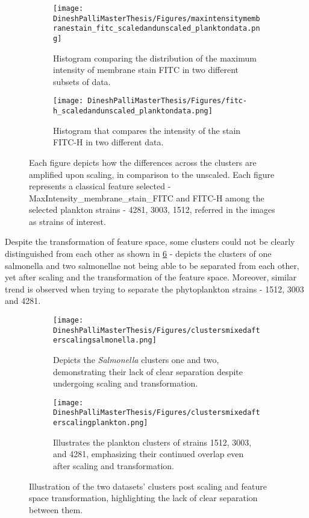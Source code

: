 \documentclass[12pt,a4paper]{article}
\begin{document}
\begin{figure}
  \centering
  \begin{subfigure}{0.45\linewidth}
    \texttt{[image: DineshPalliMasterThesis/Figures/maxintensitymembranestain\_fitc\_scaledandunscaled\_planktondata.png]}
    \caption{Histogram comparing the distribution of the maximum intensity of membrane stain FITC in two different subsets of data.}
    \label{multifig2:image_a}
  \end{subfigure}
  \hfill
  \begin{subfigure}{0.4\linewidth}
    \texttt{[image: DineshPalliMasterThesis/Figures/fitc-h\_scaledandunscaled\_planktondata.png]}
    \caption{Histogram that compares the intensity of the stain FITC-H in two different data.}
    \label{multifig2:image_b}
  \end{subfigure}
  \caption[Histograms comparing the features' intensity pre and post scaling]{Each figure depicts how the differences across the clusters are amplified upon scaling, in comparison to the unscaled. Each figure represents a classical feature selected - MaxIntensity\_membrane\_stain\_FITC and FITC-H among the selected plankton strains - 4281, 3003, 1512, referred in the images as strains of interest.}
  \label{multifig2:overall_figure}
\end{figure}

Despite the transformation of feature space, some clusters could not be clearly distinguished from each other as shown in \ref{multifig3:overall_figure} - depicts the clusters of one salmonella and two salmonellae not being able to be separated from each other, yet after scaling and the transformation of the feature space. Moreover, similar trend is observed when trying to separate the phytoplankton strains - 1512, 3003 and 4281.

\begin{figure}
  \centering
  \begin{subfigure}{0.5\linewidth}
    \texttt{[image: DineshPalliMasterThesis/Figures/clustersmixedafterscalingsalmonella.png]}
    \caption{Depicts the \textit{Salmonella} clusters one and two, demonstrating their lack of clear separation despite undergoing scaling and transformation.}
    \label{multifig3:image_a}
  \end{subfigure}
  \hfill
  \begin{subfigure}{0.5\linewidth}
    \texttt{[image: DineshPalliMasterThesis/Figures/clustersmixedafterscalingplankton.png]}
    \caption{Illustrates the plankton clusters of strains 1512, 3003, and 4281, emphasizing their continued overlap even after scaling and transformation.}
    \label{multifig3:image_b}
  \end{subfigure}
  \caption[Plots highlighting the lack of cluster separation among \textit{Salmonella} one and two, and phytoplankton strains 1512, 3003, 4281.]{Illustration of the two datasets' clusters post scaling and feature space transformation, highlighting the lack of clear separation between them.}
  \label{multifig3:overall_figure}
\end{figure}
\end{document}
